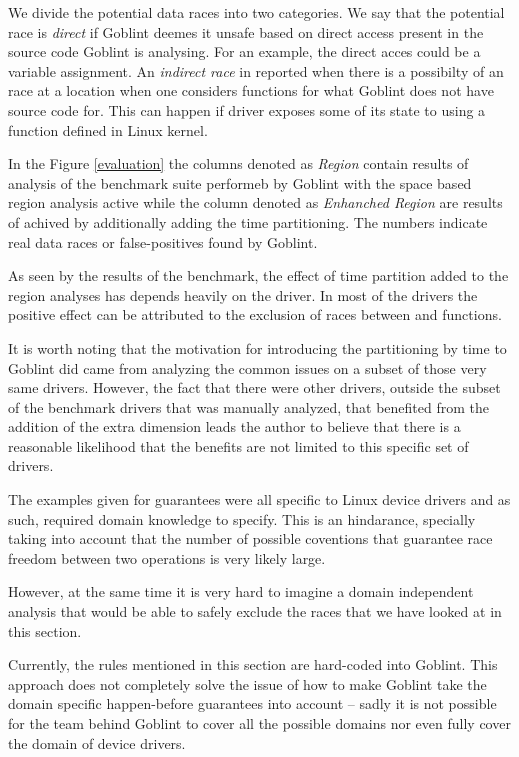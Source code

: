 \documentclass[..thesis.tex]{subfiles}
\begin{document}
We divide the potential data races into two categories. We say that the potential race is \textit{direct} if Goblint deemes it unsafe based on direct access present in the source code
Goblint is analysing. For an example, the direct acces could be a variable assignment.
An \textit{indirect race} in reported when there is a possibilty of an race at a location when one considers functions for what Goblint does not have source code for.
This can happen if driver exposes some of its state to using a function defined in Linux kernel.   

In the Figure \ref{evaluation} the columns denoted as \textit{Region} contain results of analysis of the benchmark suite performeb by Goblint with the space based region analysis active while the column denoted as \textit{Enhanched Region} are results of achived by additionally adding the time partitioning. The numbers indicate real data races or false-positives found by Goblint.

As seen by the results of the benchmark, the effect of time partition added to the region analyses has depends heavily on the driver.
In most of the drivers the positive effect can be attributed to the exclusion of races between  and  functions. 

It is worth noting that the motivation for introducing the partitioning by time to Goblint did came from analyzing the common issues on a subset of those very same drivers.
However, the fact that there were other drivers, outside the subset of the benchmark drivers that was manually analyzed,
that benefited from the addition of the extra dimension leads the author to believe that there is a reasonable likelihood
that the benefits are not limited to this specific set of drivers.


The examples given for guarantees were all specific to Linux device drivers and as such, required domain knowledge to specify. This is an hindarance,
specially taking into account that the number of possible coventions that guarantee race freedom between two operations is very likely large.  

However, at the same time it is very hard to imagine a domain independent analysis that would be able to safely exclude the races that we have looked at in this section.

Currently, the rules mentioned in this section are hard-coded into Goblint. This approach does not completely solve the issue of how to make Goblint take the domain specific happen-before
guarantees into account -- sadly it is not possible for the team behind Goblint to cover all the possible domains nor even fully cover the domain of device drivers.
\end{document}
